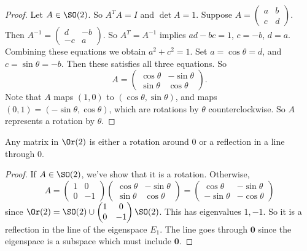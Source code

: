 \documentclass[a4paper]{article}
\begin{document}
\begin{proof}
  Let $A\in \SO(2)$. So $A^TA = I$ and $\det A = 1$. Suppose $A =
  \begin{pmatrix}
    a & b\\c & d
  \end{pmatrix}$. Then $A^{-1} =
  \begin{pmatrix}
    d & -b\\-c & a
  \end{pmatrix}.$ So $A^T = A^{-1}$ implies $ad - bc = 1$, $c = -b$, $d = a$. Combining these equations we obtain $a^2 + c^2 = 1$. Set $a = \cos\theta = d$, and $c = \sin\theta = -b$. Then these satisfies all three equations. So
  \[
    A =
    \begin{pmatrix}
      \cos\theta & -\sin\theta\\
      \sin\theta & \cos\theta
    \end{pmatrix}.
  \]
  Note that $A$ maps $(1, 0)$ to $(\cos\theta, \sin \theta)$, and maps $(0, 1)= (-\sin\theta, \cos\theta)$, which are rotations by $\theta$ counterclockwise. So $A$ represents a rotation by $\theta$.
\end{proof}

\begin{cor}
  Any matrix in $\Or(2)$ is either a rotation around $0$ or a reflection in a line through $0$.
\end{cor}

\begin{proof}
  If $A\in \SO(2)$, we've show that it is a rotation. Otherwise,
  \[
    A =
    \begin{pmatrix}
      1 & 0\\
      0 & -1
    \end{pmatrix}
    \begin{pmatrix}
      \cos\theta & -\sin\theta\\
      \sin\theta & \cos\theta
    \end{pmatrix} =
    \begin{pmatrix}
      \cos\theta & -\sin\theta \\
      -\sin\theta & -\cos\theta
    \end{pmatrix}
  \]
  since $\Or(2) = \SO(2)\cup
  \begin{pmatrix}
    1&0\\0&-1
  \end{pmatrix}\SO(2)$. This has eigenvalues $1, -1$. So it is a reflection in the line of the eigenspace $E_1$. The line goes through $\mathbf{0}$ since the eigenspace is a subspace which must include $\mathbf{0}$.
\end{proof}
\end{document}
